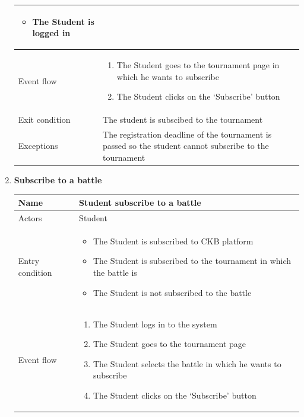 \begin{enumerate}[label=UC\arabic*:]
\begin{tabular}{|p{3cm}|p{8cm}|}
\begin{itemize}
            \item The Student is logged in
        \end{itemize}
        \\
        \hline
        Event flow &
        \begin{enumerate}[label=\arabic*.]
            \item The Student goes to the tournament page in which he wants to subscribe
            \item The Student clicks on the `Subscribe' button
        \end{enumerate} \\
        \hline
        Exit condition & The student is subscibed to the tournament \\
        \hline
        Exceptions & The registration deadline of the tournament is passed so
        the student cannot subscribe to the tournament \\
        \hline
    \end{tabular}
    \item \textbf{Subscribe to a battle} \\
    \begin{tabular}{|p{3cm}|p{8cm}|}
        \hline
        Name & Student subscribe to a battle \\
        \hline
        Actors & Student \\
        \hline
        Entry condition &
        \begin{itemize}
            \item The Student is subscribed to CKB platform
            \item The Student is subscribed to the tournament in which the battle is
            \item The Student is not subscribed to the battle
        \end{itemize}
        \\
        \hline
        Event flow &
        \begin{enumerate}[label=\arabic*.]
            \item The Student logs in to the system
            \item The Student goes to the tournament page
            \item The Student selects the battle in which he wants to subscribe
            \item The Student clicks on the `Subscribe' button
        \end{enumerate} \\

\end{tabular}
\end{enumerate}
